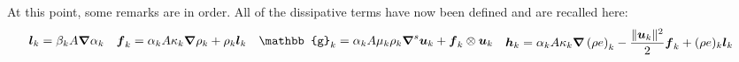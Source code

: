 At this point, some remarks are in order. All of the dissipative terms have now been defined and are recalled here:
%
\begin{subequations}\label{eq:visc-reg-7-equ-sect4}
\begin{align}
  \mbold l_k &= \beta_k A \grad \alpha_k 
\end{align}
\begin{align}
  \mbold f_k &= \alpha_k A \kappa_k \grad \rho_k + \rho_k  \mbold l_k 
\end{align}
\begin{align}
\mathbb{g}_k &= \alpha_k A \mu_k \rho_k \grad^s \mbold u_k + \mbold f_k \otimes \mbold u_k 
\end{align}
\begin{align}
  \mbold h_k &=  \alpha_k A \kappa_k \grad \left( \rho e \right)_k  - \frac{\| \mbold u_k \|^2}{2} \mbold f_k + (\rho e)_k \mbold l_k 
\end{align}
\end{subequations}
%
